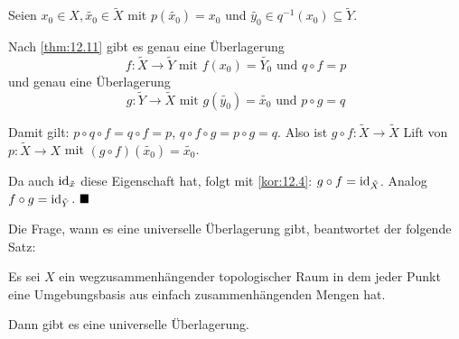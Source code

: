 \begin{beweis}
    Seien $x_0 \in X, \tilde{x_0} \in \tilde{X}$ mit 
    $p(\tilde{x_0}) = x_0$ und 
    $\tilde{y_0} \in q^{-1}(x_0) \subseteq \tilde{Y}$.

    Nach \cref{thm:12.11} gibt es genau eine Überlagerung
    \[f:\tilde{X} \rightarrow \tilde{Y} \text{ mit } f(x_0) = \tilde{Y_0} \text{ und } q \circ f = p\]
    und genau eine Überlagerung
    \[g: \tilde{Y} \rightarrow \tilde{X} \text{ mit } g(\tilde{y_0}) = \tilde{x_0} \text{ und } p \circ g = q\]

    Damit gilt: $p \circ q \circ f = q \circ f = p$, $q \circ f \circ g = p \circ g = q$.
    Also ist $g \circ f: \tilde{X} \rightarrow \tilde{X}$ Lift von 
    $p:\tilde{X} \rightarrow X$ mit $(g \circ f) (\tilde{x_0}) = \tilde{x_0}$.

    Da auch $\textnormal{id}_{\tilde{x}}$ diese Eigenschaft hat, folgt mit
    \cref{kor:12.4}: $g \circ f = \textnormal{id}_{\tilde{X}}$.
    Analog $f \circ g = \textnormal{id}_{\tilde{Y}}$. $\qed$
\end{beweis}

Die Frage, wann es eine universelle Überlagerung gibt, beantwortet
der folgende Satz:

\begin{satz}%
    Es sei $X$ ein wegzusammenhängender topologischer Raum in dem
    jeder Punkt eine Umgebungsbasis aus einfach zusammenhängenden
    Mengen hat.

    Dann gibt es eine universelle Überlagerung.
\end{satz}

